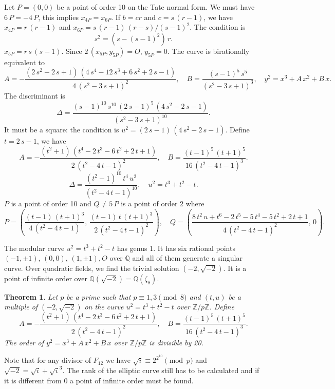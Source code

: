 \documentclass[a4paper, 11pt, pdftex]{report}
\theoremstyle{plain}
\newtheorem{theorem}{Theorem}[chapter]
\theoremstyle{definition}
\begin{document}
Let $P = (0, 0)$ be a point of order 10 on the Tate normal form. We must have $6\,P = -4\,P$,
this implies $x_{4P} = x_{6P}$. If $b = cr$ and $c = s\,(r - 1)$,
we have $x_{4P} = r\,(r - 1)$ and $x_{6P} = s\,(r - 1)\,(r - s) / (s - 1)^2$.
The condition is
$$s^2 = (s - (s - 1)^2)\,r.$$
$x_{5P} = r\,s\,(s - 1)$. Since $2\,(x_{5P}, y_{5P}) = O$, $y_{5P} = 0$. The curve is 
birationally equivalent to
$$A = -\frac{(2\,s^2 - 2\,s + 1)\,(4\,s^4 - 12\,s^3 + 6\,s^2 + 2\,s - 1)}{4\,(s^2 - 3\,s + 1)^2},\quad
B = \frac{(s - 1)^5\, s^5}{(s^2 - 3\,s + 1)^3},\quad y^2 = x^3 + A\,x^2 + B\,x.$$
The discriminant is
$$\Delta = \frac{(s-1)^{10}\,s^{10}\,(2\,s - 1)^5\,(4\,s^2 - 2\,s - 1)}{(s^2 - 3\,s + 1)^{10}}.$$
It must be a square: the condition is $u^2 = (2\,s - 1)\,(4\,s^2 - 2\,s - 1)$.
Define $t = 2\,s - 1$, we have
$$A = -\frac{(t^2 + 1)\,(t^4 - 2\,t^3 - 6 \,t^2 + 2\,t + 1)}{2\,(t^2 - 4\,t - 1)^2},\quad
B = \frac{(t - 1)^5\,(t + 1)^5}{16\,(t^2 - 4\,t - 1)^3}.$$
$$\Delta = \frac{(t^2 - 1)^{10}\,t^4\,u^2}{(t^2 - 4\,t - 1)^{10}},\quad
u^2 = t^3 + t^2 - t.$$
$P$ is a point of order 10 and $Q \neq 5\,P$ is a point of order 2 where
$$P = \left(\frac{(t - 1)\,(t + 1)^3}{4\,(t^2 - 4\,t - 1)},\,
            \frac{(t - 1)\,t\,(t + 1)^3}{2\,(t^2 - 4\,t - 1)^2}\right),\quad
  Q = \left(\frac{8\,t^2\,u + t^6 - 2\,t^5 - 5\,t^4 - 5\,t^2 + 2\,t + 1}
                 {4\,(t^2 - 4\,t - 1)^2},\, 0\right).$$

The modular curve $u^2 = t^3 + t^2 - t$ has genus 1. It has six rational points
$(-1, \pm1)$, $(0, 0)$, $(1, \pm1), O$ over $\mathbb{Q}$ and all of them generate a singular curve.
Over quadratic fields, we find the trivial solution $(-2, \sqrt{-2})$. It is a point of
infinite order over $\mathbb{Q}(\sqrt{-2}) = \mathbb{Q}(\zeta_8)$.

\begin{theorem}
Let $p$ be a prime such that $p \equiv 1, 3 \pmod{8}$ and $(t, u)$ be a multiple
of $(-2, \sqrt{-2})$ on the curve $u^2 = t^3 + t^2 - t$ over $\mathbb{Z}/p\mathbb{Z}$.
Define
$$A = -\frac{(t^2 + 1)\,(t^4 - 2\,t^3 - 6 \,t^2 + 2\,t + 1)}{2\,(t^2 - 4\,t - 1)^2},\quad
B = \frac{(t - 1)^5\,(t + 1)^5}{16\,(t^2 - 4\,t - 1)^3}.$$
The order of $y^2 = x^3 + A\,x^2 + B\,x$ over $\mathbb{Z}/p\mathbb{Z}$ is divisible by 20.
\end{theorem}
Note that for any divisor of $F_{12}$ we have $\sqrt{i} \equiv 2^{2^{10}} \pmod{p}$ and
$\sqrt{-2} = \sqrt{i} + \sqrt{i}^3$.
The rank of the elliptic curve still has to be calculated and if it is different from 0
a point of infinite order must be found.
\end{document}
